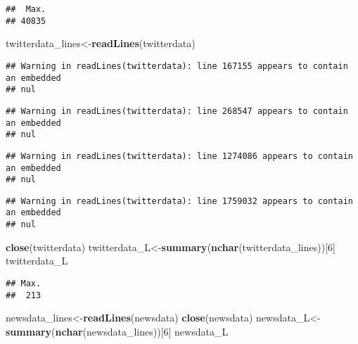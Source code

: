 \documentclass[
]{article}
\newenvironment{Shaded}{\begin{snugshade}}{\end{snugshade}}
\newcommand{\DecValTok}[1]{\textcolor[rgb]{0.00,0.00,0.81}{#1}}
\newcommand{\KeywordTok}[1]{\textcolor[rgb]{0.13,0.29,0.53}{\textbf{#1}}}
\newcommand{\NormalTok}[1]{#1}
\begin{document}
\begin{verbatim}
##  Max. 
## 40835
\end{verbatim}

\begin{Shaded}
\begin{Highlighting}[]
\NormalTok{twitterdata_lines<-}\KeywordTok{readLines}\NormalTok{(twitterdata)}
\end{Highlighting}
\end{Shaded}

\begin{verbatim}
## Warning in readLines(twitterdata): line 167155 appears to contain an embedded
## nul
\end{verbatim}

\begin{verbatim}
## Warning in readLines(twitterdata): line 268547 appears to contain an embedded
## nul
\end{verbatim}

\begin{verbatim}
## Warning in readLines(twitterdata): line 1274086 appears to contain an embedded
## nul
\end{verbatim}

\begin{verbatim}
## Warning in readLines(twitterdata): line 1759032 appears to contain an embedded
## nul
\end{verbatim}

\begin{Shaded}
\begin{Highlighting}[]
\KeywordTok{close}\NormalTok{(twitterdata)}
\NormalTok{twitterdata_L<-}\KeywordTok{summary}\NormalTok{(}\KeywordTok{nchar}\NormalTok{(twitterdata_lines))[}\DecValTok{6}\NormalTok{]}
\NormalTok{twitterdata_L}
\end{Highlighting}
\end{Shaded}

\begin{verbatim}
## Max. 
##  213
\end{verbatim}

\begin{Shaded}
\begin{Highlighting}[]
\NormalTok{newsdata_lines<-}\KeywordTok{readLines}\NormalTok{(newsdata)}
\KeywordTok{close}\NormalTok{(newsdata)}
\NormalTok{newsdata_L<-}\KeywordTok{summary}\NormalTok{(}\KeywordTok{nchar}\NormalTok{(newsdata_lines))[}\DecValTok{6}\NormalTok{]}
\NormalTok{newsdata_L}
\end{Highlighting}
\end{Shaded}
\end{document}
